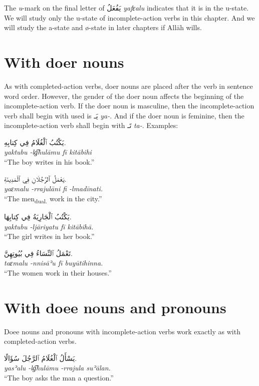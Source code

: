\documentclass[
  10pt,
]{book}
\begin{document}
The \emph{u}-mark on the final letter of \foreignlanguage{arabic}{يَفُعَلُ} \emph{yafɛalu} indicates that it is in the u-state. We will study only the u-state of incomplete-action verbs in this chapter. And we will study the a-state and ø-state in later chapters if Allāh wills.

\section{With doer nouns}\label{with-doer-nouns}

As with completed-action verbs, doer nouns are placed after the verb in sentence word order. However, the gender of the doer noun affects the beginning of the incomplete-action verb. If the doer noun is masculine, then the incomplete-action verb shall begin with used is \foreignlanguage{arabic}{يَـ} \emph{ya-}. And if the doer noun is feminine, then the incomplete-action verb shall begin with \foreignlanguage{arabic}{تَـ} \emph{ta-}. Examples:

\foreignlanguage{arabic}{يَکْتُبُ ٱلْغُلَامُ فِي کِتابِهِ.}\\
\emph{yaktubu -lg͡hulāmu fī kitābihi}\\
\enquote{The boy writes in his book.}

\foreignlanguage{arabic}{يَعْمَلُ ٱلرَّجُلَانِ فِي ٱلْمَدِينَةِ.}\\
\emph{yaɛmalu -rrajulāni fi -lmadīnati.}\\
\enquote{The men\textsubscript{dual.} work in the city.}

\foreignlanguage{arabic}{يَکْتُبُ ٱلْجَارِيَةُ فِي کِتابِهَا.}\\
\emph{yaktubu -ljāriyatu fī kitābihā.}\\
\enquote{The girl writes in her book.}

\foreignlanguage{arabic}{تَعْمَلُ ٱلنِّسَاءُ فِي بُيُوتِهِنَّ.}\\
\emph{taɛmalu -nnisāʾu fī buyūtihinna.}\\
\enquote{The women work in their houses.}

\section{With doee nouns and pronouns}\label{with-doee-nouns-and-pronouns}

Doee nouns and pronouns with incomplete-action verbs work exactly as with completed-action verbs.

\foreignlanguage{arabic}{يَسْأَلُ ٱلْغُلَامُ ٱلرَّجُلَ سُؤَالًا.}\\
\emph{yasʾalu -lg͡hulāmu -rrajula suʾālan.}\\
\enquote{The boy asks the man a question.}
\end{document}
